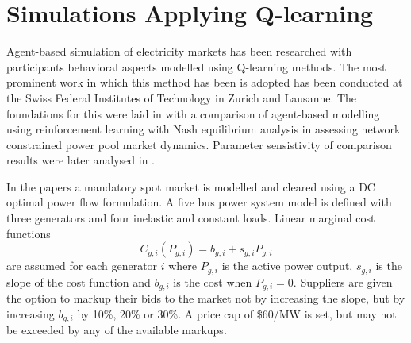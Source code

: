 \section{Simulations Applying Q-learning}
%
Agent-based simulation of electricity markets has been researched with
participants behavioral aspects modelled using Q-learning methods.  The most
prominent work in which this method has been is adopted has been conducted at
the Swiss Federal Institutes of Technology in Zurich and Lausanne.  The
foundations for this were laid in \cite{krause:nash04} with a
comparison of agent-based modelling using reinforcement learning with Nash
equilibrium analysis in assessing network constrained power pool market
dynamics.  Parameter sensistivity of comparison results were later analysed in
\cite{krause:nash06}.

In the papers a mandatory spot market is modelled and cleared using a DC
optimal power flow formulation.  A five bus power system model is defined with
three generators and four inelastic and constant loads.  Linear marginal cost
functions
\begin{equation}
C_{g,i}(P_{g,i}) = b_{g,i} + s_{g,i}P_{g,i}
\end{equation}
are assumed for each generator $i$ where $P_{g,i}$ is the active power output,
$s_{g,i}$ is the slope of the cost function and $b_{g,i}$ is the cost when
$P_{g,i} = 0$.  Suppliers are given the option to markup their bids to the
market not by increasing the slope, but by increasing $b_{g,i}$ by 10\%, 20\%
or 30\%.  A price cap of \$60/MW is set, but may not be exceeded by any of the
available markups.

